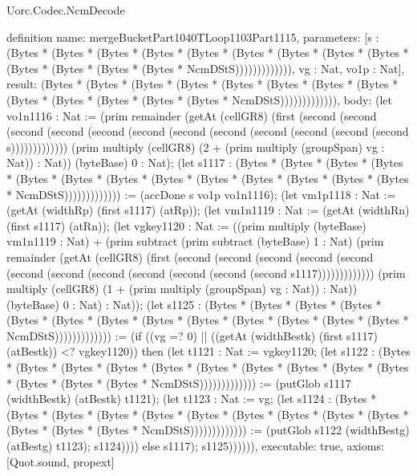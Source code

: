\begin{lexlean}{Uorc.Codec.NcmDecode}
\begin{semanticmodule}
definition{
  name: mergeBucketPart1040TLoop1103Part1115,
  parameters: [s : (Bytes * (Bytes * (Bytes * (Bytes * (Bytes * (Bytes * (Bytes * (Bytes * (Bytes * (Bytes * (Bytes * (Bytes * (Bytes * NcmDStS))))))))))))), vg : Nat, vo1p : Nat],
  result: (Bytes * (Bytes * (Bytes * (Bytes * (Bytes * (Bytes * (Bytes * (Bytes * (Bytes * (Bytes * (Bytes * (Bytes * (Bytes * NcmDStS))))))))))))),
  body: (let vo1n1116 : Nat := (prim remainder (getAt (cellGR8) (first (second (second (second (second (second (second (second (second (second (second (second (second s))))))))))))) (prim multiply (cellGR8) (2 + (prim multiply (groupSpan) vg : Nat)) : Nat)) (byteBase) 0 : Nat); (let s1117 : (Bytes * (Bytes * (Bytes * (Bytes * (Bytes * (Bytes * (Bytes * (Bytes * (Bytes * (Bytes * (Bytes * (Bytes * (Bytes * NcmDStS))))))))))))) := (accDone s vo1p vo1n1116); (let vm1p1118 : Nat := (getAt (widthRp) (first s1117) (atRp)); (let vm1n1119 : Nat := (getAt (widthRn) (first s1117) (atRn)); (let vgkey1120 : Nat := ((prim multiply (byteBase) vm1n1119 : Nat) + (prim subtract (prim subtract (byteBase) 1 : Nat) (prim remainder (getAt (cellGR8) (first (second (second (second (second (second (second (second (second (second (second (second (second s1117))))))))))))) (prim multiply (cellGR8) (1 + (prim multiply (groupSpan) vg : Nat)) : Nat)) (byteBase) 0 : Nat) : Nat)); (let s1125 : (Bytes * (Bytes * (Bytes * (Bytes * (Bytes * (Bytes * (Bytes * (Bytes * (Bytes * (Bytes * (Bytes * (Bytes * (Bytes * NcmDStS))))))))))))) := (if ((vg =? 0) || ((getAt (widthBestk) (first s1117) (atBestk)) <? vgkey1120)) then (let t1121 : Nat := vgkey1120; (let s1122 : (Bytes * (Bytes * (Bytes * (Bytes * (Bytes * (Bytes * (Bytes * (Bytes * (Bytes * (Bytes * (Bytes * (Bytes * (Bytes * NcmDStS))))))))))))) := (putGlob s1117 (widthBestk) (atBestk) t1121); (let t1123 : Nat := vg; (let s1124 : (Bytes * (Bytes * (Bytes * (Bytes * (Bytes * (Bytes * (Bytes * (Bytes * (Bytes * (Bytes * (Bytes * (Bytes * (Bytes * NcmDStS))))))))))))) := (putGlob s1122 (widthBestg) (atBestg) t1123); s1124)))) else s1117); s1125)))))),
  executable: true,
  axioms: [Quot.sound, propext]
}


\end{semanticmodule}
\end{lexlean}
